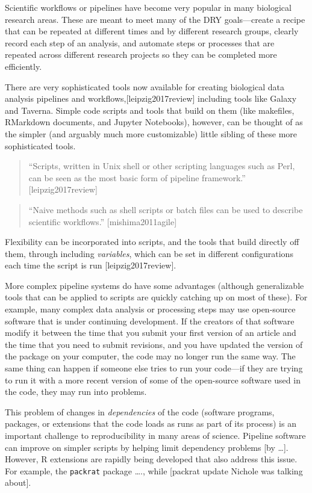 \documentclass[]{tufte-book}
\begin{document}
Scientific workflows or pipelines have become very popular in many biological
research areas. These are meant to meet many of the DRY goals---create a
recipe that can be repeated at different times and by different research groups,
clearly record each step of an analysis, and automate steps or processes that
are repeated across different research projects so they can be completed
more efficiently.

There are very sophisticated tools now available for creating biological data
analysis pipelines and workflows,{[}leipzig2017review{]} including tools like Galaxy
and Taverna. Simple code scripts and tools that build on them (like makefiles,
RMarkdown documents, and Jupyter Notebooks), however, can be thought of as the
simpler (and arguably much more customizable) little sibling of these more
sophisticated tools.

\begin{quote}
``Scripts, written in Unix shell or other scripting languages such as Perl, can
be seen as the most basic form of pipeline framework.'' {[}leipzig2017review{]}
\end{quote}

\begin{quote}
``Naive methods such as shell scripts or batch files can be used to describe
scientific workflows.'' {[}mishima2011agile{]}
\end{quote}

Flexibility can be incorporated into scripts, and the tools that build directly off
them, through including \emph{variables}, which can be set in different configurations
each time the script is run {[}leipzig2017review{]}.

More complex pipeline systems do have some advantages (although generalizable tools
that can be applied to scripts are quickly catching up on most of these). For
example, many complex data analysis or processing steps may use open-source
software that is under continuing development. If the creators of that software
modify it between the time that you submit your first version of an article and
the time that you need to submit revisions, and you have updated the version
of the package on your computer, the code may no longer run the same way. The same
thing can happen if someone else tries to run your code---if they are trying to
run it with a more recent version of some of the open-source software used in the
code, they may run into problems.

This problem of changes in \emph{dependencies} of the code (software programs, packages,
or extensions that the code loads as runs as part of its process) is an important
challenge to reproducibility in many areas of science. Pipeline software can improve
on simpler scripts by helping limit dependency problems {[}by \ldots{}{]}. However,
R extensions are rapidly being developed that also address this issue. For example,
the \texttt{packrat} package \ldots{}., while {[}packrat update Nichole was talking about{]}.
\end{document}

